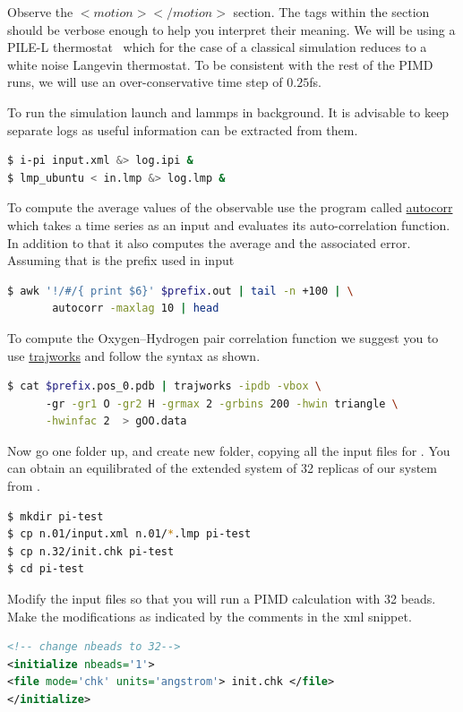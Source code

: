 \documentclass{article}
\begin{document}
\begin{Exercise}[label={water},title={Benchmark of quantum effects in a water molecule}]
\Question
Observe the \lstinxml$<motion></motion>$ section. The tags within the section should be 
verbose enough to help you interpret their meaning. We will be using a PILE-L thermostat~\cite{ceri+10jcp}
 which for the case of a classical simulation reduces to a white noise Langevin thermostat. 
To be consistent with the rest of the PIMD runs, we will use an over-conservative time step of $0.25$fs. 

\Question
To run the simulation launch \ipi{} and lammps in background. It is advisable to keep separate 
logs as useful information can be extracted from them.
\begin{lstlisting}[language=bash]
$ i-pi input.xml &> log.ipi &
$ lmp_ubuntu < in.lmp &> log.lmp &
\end{lstlisting}
To compute the average values of the observable use the program called \url{autocorr} which takes a time series as an input and evaluates its auto-correlation function. In addition to that it also computes the average and the associated error. Assuming that  is the prefix used in \ipi{} input \begin{lstlisting}[language=bash]
$ awk '!/#/{ print $6}' $prefix.out | tail -n +100 | \
       autocorr -maxlag 10 | head
\end{lstlisting}

\Question
To compute the Oxygen--Hydrogen pair correlation function we suggest you to use \url{trajworks} and follow the syntax as shown. 
\begin{lstlisting}[language=bash]
$ cat $prefix.pos_0.pdb | trajworks -ipdb -vbox \ 
      -gr -gr1 O -gr2 H -grmax 2 -grbins 200 -hwin triangle \
      -hwinfac 2  > gOO.data 
\end{lstlisting}

\Question
Now go one folder up, and create new folder, copying all the input files 
for . You can obtain an equilibrated 
of the extended system of 32 replicas of our system from 
\lstinbash{n.32/init.chk}.

\begin{lstlisting}[language=bash]
$ mkdir pi-test
$ cp n.01/input.xml n.01/*.lmp pi-test
$ cp n.32/init.chk pi-test
$ cd pi-test
\end{lstlisting}

\Question
Modify the input files so that you will run a PIMD calculation with 32 beads.
Make the modifications as indicated by the comments in the xml snippet.
\begin{lstlisting}[language=xml]
<!-- change nbeads to 32--> 
<initialize nbeads='1'>  
<file mode='chk' units='angstrom'> init.chk </file>
</initialize>


\end{lstlisting}
\end{Exercise}
\end{document}
